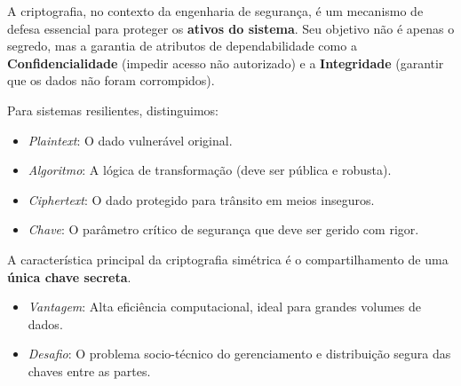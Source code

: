 \documentclass[12pt]{article}
\begin{document}
\begin{description}[style=nextline, font=\bfseries\color{meuazul}]
    
    \item[Resposta 1:] A criptografia, no contexto da engenharia de segurança, é um mecanismo de defesa essencial para proteger os \textbf{ativos do sistema}. Seu objetivo não é apenas o segredo, mas a garantia de atributos de dependabilidade como a \textbf{Confidencialidade} (impedir acesso não autorizado) e a \textbf{Integridade} (garantir que os dados não foram corrompidos).

    \begin{center}
    \end{center}

    \item[Resposta 2:] Para sistemas resilientes, distinguimos: 
    \begin{itemize}[label=--]
        \item \textit{Plaintext}: O dado vulnerável original.
        \item \textit{Algoritmo}: A lógica de transformação (deve ser pública e robusta).
        \item \textit{Ciphertext}: O dado protegido para trânsito em meios inseguros.
        \item \textit{Chave}: O parâmetro crítico de segurança que deve ser gerido com rigor.
    \end{itemize}

    \item[Resposta 3:] A característica principal da criptografia simétrica é o compartilhamento de uma \textbf{única chave secreta}. 
    \begin{itemize}[label=--]
        \item \textit{Vantagem}: Alta eficiência computacional, ideal para grandes volumes de dados.
        \item \textit{Desafio}: O problema socio-técnico do gerenciamento e distribuição segura das chaves entre as partes.
    \end{itemize}


\end{description}
\end{document}
